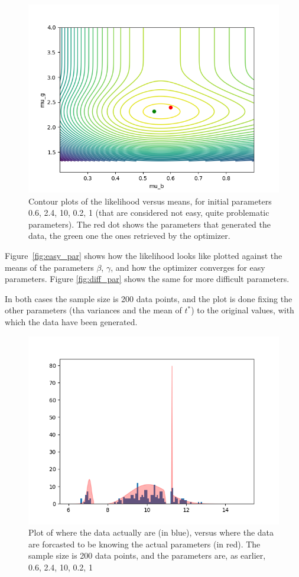 \documentclass{article}
\begin{document}
\begin{figure}
  \centering
  \includegraphics[width=.8\textwidth]{img/contour_mus_not_converging.png}
  \caption{Contour plots of the likelihood versus means, for initial parameters 0.6, 2.4, 10, 0.2, 1 (that are considered not easy, quite problematic parameters). The red dot shows the parameters that generated the data, the green one the ones retrieved by the optimizer.}
  \label{fig:diff_par}
\end{figure}


Figure~\ref{fig:easy_par} shows how the likelihood looks like plotted against the means of the parameters \(\beta\), \(\gamma\), and how the optimizer converges for easy parameters.
Figure \autoref{fig:diff_par} shows the same for more difficult parameters.

In both cases the sample size is 200 data points, and the plot is done fixing the other parameters (tha variances and the mean of \(t^*\)) to the original values, with which the data have been generated.

\begin{figure}
  \centering
  \includegraphics[width=.8\textwidth]{img/likelihood_over_ta}
  \caption{Plot of where the data actually are (in blue), versus where the data are forcasted to be knowing the actual parameters (in red). The sample size is 200 data points, and the parameters are, as earlier, 0.6, 2.4, 10, 0.2, 1}
  \label{fig:likelihood_over_tas}
\end{figure}
\end{document}
